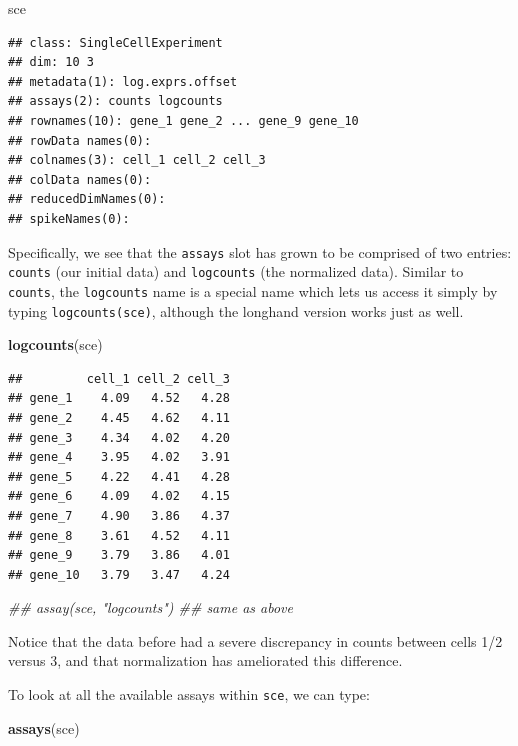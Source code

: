 \documentclass[]{book}
\newenvironment{Shaded}{\begin{snugshade}}{\end{snugshade}}
\newcommand{\CommentTok}[1]{\textcolor[rgb]{0.56,0.35,0.01}{\textit{#1}}}
\newcommand{\KeywordTok}[1]{\textcolor[rgb]{0.13,0.29,0.53}{\textbf{#1}}}
\newcommand{\NormalTok}[1]{#1}
\begin{document}
\begin{Shaded}
\begin{Highlighting}[]
\NormalTok{sce}
\end{Highlighting}
\end{Shaded}

\begin{verbatim}
## class: SingleCellExperiment 
## dim: 10 3 
## metadata(1): log.exprs.offset
## assays(2): counts logcounts
## rownames(10): gene_1 gene_2 ... gene_9 gene_10
## rowData names(0):
## colnames(3): cell_1 cell_2 cell_3
## colData names(0):
## reducedDimNames(0):
## spikeNames(0):
\end{verbatim}

Specifically, we see that the \texttt{assays} slot has grown to be comprised of two entries: \texttt{counts} (our initial data) and \texttt{logcounts} (the normalized data). Similar to \texttt{counts}, the \texttt{logcounts} name is a special name which lets us access it simply by typing \texttt{logcounts(sce)}, although the longhand version works just as well.

\begin{Shaded}
\begin{Highlighting}[]
\KeywordTok{logcounts}\NormalTok{(sce)}
\end{Highlighting}
\end{Shaded}

\begin{verbatim}
##         cell_1 cell_2 cell_3
## gene_1    4.09   4.52   4.28
## gene_2    4.45   4.62   4.11
## gene_3    4.34   4.02   4.20
## gene_4    3.95   4.02   3.91
## gene_5    4.22   4.41   4.28
## gene_6    4.09   4.02   4.15
## gene_7    4.90   3.86   4.37
## gene_8    3.61   4.52   4.11
## gene_9    3.79   3.86   4.01
## gene_10   3.79   3.47   4.24
\end{verbatim}

\begin{Shaded}
\begin{Highlighting}[]
\CommentTok{## assay(sce, "logcounts") ## same as above}
\end{Highlighting}
\end{Shaded}

Notice that the data before had a severe discrepancy in counts between cells 1/2 versus 3, and that normalization has ameliorated this difference.

To look at all the available assays within \texttt{sce}, we can type:

\begin{Shaded}
\begin{Highlighting}[]
\KeywordTok{assays}\NormalTok{(sce)}
\end{Highlighting}
\end{Shaded}
\end{document}
